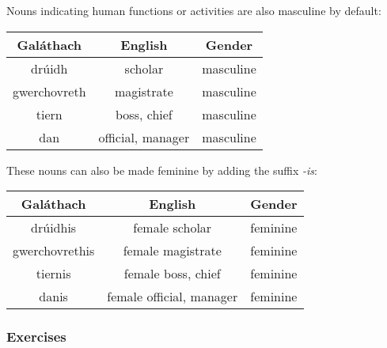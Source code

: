 Nouns indicating human functions or activities are also masculine by default:
\begin{table}[H]
\centering
\begin{tabu}{c|c|c}
  \textbf{Gal\'{a}thach} & \textbf{English} & \textbf{Gender}\\
  \toprule
  dr\'{u}idh & scholar & masculine\\
  gwerchovreth & magistrate & masculine\\
  tiern & boss, chief & masculine\\
  dan & official, manager & masculine
\end{tabu}
\label{example_gender_human_functions}
\end{table}

These nouns can also be made feminine by adding the suffix \textit{-is}:
\begin{table}[H]
\centering
\begin{tabu}{c|c|c}
  \textbf{Gal\'{a}thach} & \textbf{English} & \textbf{Gender}\\
  \toprule
  dr\'{u}idhis & female scholar & feminine\\
  gwerchovrethis & female magistrate & feminine\\
  tiernis & female boss, chief & feminine\\
  danis & female official, manager & feminine
\end{tabu}
\label{example_gender_human_functions_femalize}
\end{table}

\newpage
\subsubsection{Exercises}

